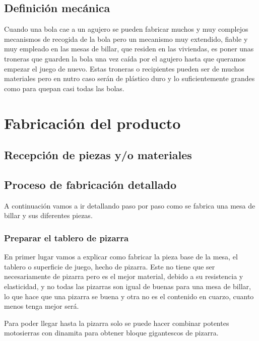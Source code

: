 		    

	\subsection {Definición mecánica}
		    Cuando una bola cae a un agujero se pueden fabricar muchos y muy complejos mecanismos de recogida de la bola pero un mecanismo muy extendido,
		    fiable y muy empleado en las mesas de billar, que residen en las viviendas, es poner unas troneras que guarden la bola una vez caída por el agujero hasta que queramos empezar
		    el juego de nuevo. Estas troneras o recipientes pueden ser de muchos materiales pero en nutro caso serán de plástico duro y lo suficientemente grandes como para quepan casi todas las bolas. 
\section {Fabricación del producto}

	\subsection {Recepción de piezas y/o materiales}

	\subsection {Proceso de fabricación detallado}
		A  continuación vamos a  ir detallando paso por paso como se fabrica una mesa de billar y sus diferentes piezas.
		
		\subsubsection {Preparar el tablero de pizarra}
			En primer lugar vamos a explicar como fabricar la pieza base de la mesa, el tablero o superficie de juego, hecho de pizarra. Este no tiene que ser necesariamente de pizarra pero es el mejor material, debido a  su resistencia y elasticidad, y no todas las pizarras son igual de buenas para una mesa de billar, lo que hace que una pizarra se buena y otra no es el contenido en cuarzo, cuanto menos tenga mejor será.

Para poder llegar hasta la pizarra solo se puede hacer combinar potentes motosierras con dinamita para obtener bloque gigantescos de pizarra.

